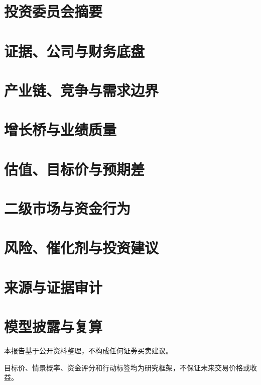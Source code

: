 \documentclass[a4paper,11pt,openany,fontset=none]{ctexrep}
\newcommand{\reportdisclaimer}{本报告基于公开资料整理，不构成任何证券买卖建议。}
\begin{document}
\astockcover
\tableofcontents
\clearpage
\chapter{投资委员会摘要}

\chapter{证据、公司与财务底盘}

\chapter{产业链、竞争与需求边界}

\chapter{增长桥与业绩质量}

\chapter{估值、目标价与预期差}

\chapter{二级市场与资金行为}

\chapter{风险、催化剂与投资建议}

\appendix
\chapter{来源与证据审计}

\chapter{模型披露与复算}

\clearpage
\thispagestyle{empty}
\vspace*{4cm}
\begin{disclosurebox}[免责声明]
\small
\reportdisclaimer\par
目标价、情景概率、资金评分和行动标签均为研究框架，不保证未来交易价格或收益。
\end{disclosurebox}
\end{document}
